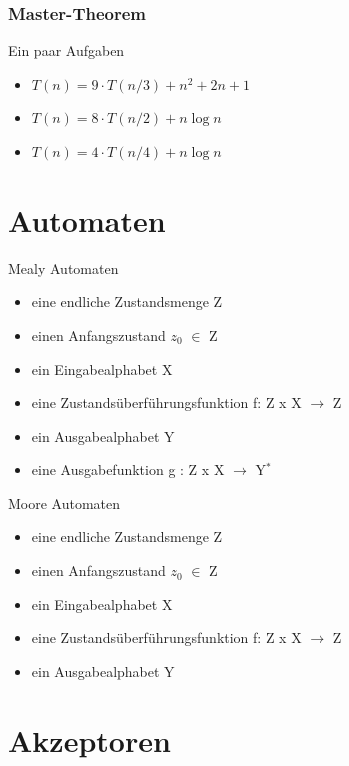 \documentclass{beamer}
\begin{document}
\begin{frame}
	\frametitle{Master-Theorem}
	\begin{block}{Ein paar Aufgaben}
		\begin{itemize}
			\item $T(n) = 9\cdot T(n/3) + n^2 + 2n + 1$
			\item $T(n) = 8\cdot T(n/2) + n\log{n}$
			\item $T(n) = 4\cdot T(n/4) + n\log{n}$
		\end{itemize}
	\end{block}
\end{frame}

\section{Automaten}

\begin{frame}
\begin{block}{Mealy Automaten}
	\begin{itemize}
		\item eine endliche Zustandsmenge Z
		\item einen Anfangszustand $z_0$ $\in$ Z
		\item ein Eingabealphabet X
		\item eine Zustandsüberführungsfunktion f: Z x X $\rightarrow$ Z
		\item ein Ausgabealphabet Y
		\item eine Ausgabefunktion g : Z x X $\rightarrow$ Y$^\ast$
	\end{itemize}	
\end{block}
\begin{block}{Moore Automaten}		
	\begin{itemize}
		\item eine endliche Zustandsmenge Z
		\item einen Anfangszustand $z_0$ $\in$ Z
		\item ein Eingabealphabet X
		\item eine Zustandsüberführungsfunktion f: Z x X $\rightarrow$ Z
		\item ein Ausgabealphabet Y
	\end{itemize} 
\end{block}
\end{frame}

\section{Akzeptoren}
\end{document}
